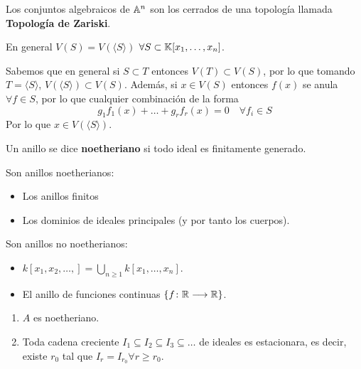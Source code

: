 \documentclass[ACGA.tex]{subfiles}
\begin{document}
\begin{defi}
Los conjuntos algebraicos de $\mathbb{A}^n$ son los cerrados de una topología llamada \textbf{Topología de Zariski}.
\end{defi}
\begin{prop}
En general $V(S)=V(\langle S\rangle)$ $\forall S \subset  \mathbb{K}[x_1,\dotsc,x_n]$.
\end{prop}
\begin{dem}
Sabemos que en general si $S\subset T$ entonces $V(T)\subset V(S)$, por lo que tomando $T=\langle S \rangle$, $V(\langle S\rangle)\subset V(S)$. Además, si $x\in V(S)$ entonces $f(x)$ se anula $\forall f \in S$, por lo que cualquier combinación de la forma
\[
g_1 f_1(x)+ \dotsc + g_rf_r(x) = 0 \quad \forall f_i \in S
\]
Por lo que $x\in V(\langle S\rangle)$.\QED
\end{dem}
\begin{defi}
Un anillo se dice \textbf{noetheriano} si todo ideal es finitamente generado.
\end{defi}
\begin{prop}
Son anillos noetherianos:
\begin{itemize}
\item Los anillos finitos
\item Los dominios de ideales principales (y por tanto los cuerpos).
\end{itemize}
\end{prop}
\begin{nota}
Son anillos no noetherianos:
\begin{itemize}
	\item $k[x_1,x_2,\dots,] = \bigcup_{n \geq 1} k[x_1,\dots,x_n]$.
	\item El anillo de funciones continuas $\{f \colon{\mathbb{R}}\longrightarrow{\mathbb{R}}\}$.
\end{itemize}
\end{nota}
\begin{prop}\mbox{}
\begin{enumerate}
	\item $A$ es noetheriano.
	\item Toda cadena creciente $I_1 \subseteq I_2 \subseteq I_3 \subseteq \dots$ de ideales es estacionara, es decir, existe $r_0$ tal que $I_r = I_{r_0} \forall r \geq r_0$.
\end{enumerate}
\end{prop}
\end{document}
